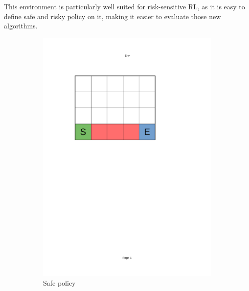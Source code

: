 This environment is particularly well suited for risk-sensitive RL, as it is easy to define safe and risky policy on it, making it easier to evaluate those new algorithms.

\begin{figure}[!ht]
    \centering
    \begin{subfigure}{0.45\textwidth}
        \centering
            \includegraphics[page=2, trim = 40mm 160mm 70mm 45mm, clip, height=0.2\textheight]{figures/personal_work/policies.pdf}
        \caption{Safe policy}
        \label{SafePolicy}
    \end{subfigure}
    \hfill
    \begin{subfigure}{0.45\textwidth}
        \centering

\end{subfigure}
\end{figure}
